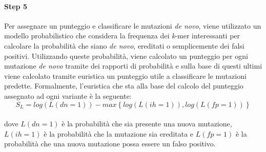 \documentclass[../main.tex]{subfiles}
\begin{document}
\paragraph{Step 5} 

Per assegnare un punteggio e classificare le mutazioni \textit{de novo}, viene utilizzato un modello probabilistico che considera la frequenza dei \textit{k}-mer interessanti per calcolare la probabilità che siano \textit{de novo}, ereditati o semplicemente dei falsi positivi. Utilizzando queste probabilità, viene calcolato un punteggio per ogni mutazione \textit{de novo} tramite dei rapporti di probabilità e sulla base di questi ultimi viene calcolato tramite euristica un punteggio utile a classificare le mutazioni predette. Formalmente, l'euristica che sta alla base del calcolo del punteggio assegnato ad ogni variante è la seguente: \\
$$S_L = log \left(L\left(dn=1\right)\right) - max\left\lbrace log\left(L\left(ih=1\right)\right), log\left(L\left(fp=1\right)\right)\right\rbrace$$
\noindent
\\
dove $L\left(dn=1\right)$ è la probabilità che sia presente una nuova mutazione, $L\left(ih=1\right)$ è la probabilità che la mutazione sia ereditata e $L\left(fp=1\right)$ è la probabilità che una nuova mutazione possa essere un falso positivo.

%
%
\end{document}
